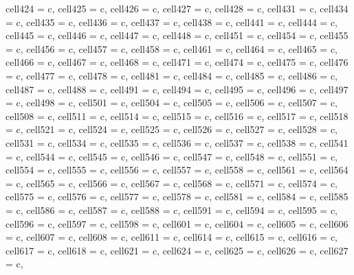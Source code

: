 \begin{longtblr}[
  label = none,
  entry = none,
]
{  cell{42}{4} = {c},
  cell{42}{5} = {c},
  cell{42}{6} = {c},
  cell{42}{7} = {c},
  cell{42}{8} = {c},
  cell{43}{1} = {c},
  cell{43}{4} = {c},
  cell{43}{5} = {c},
  cell{43}{6} = {c},
  cell{43}{7} = {c},
  cell{43}{8} = {c},
  cell{44}{1} = {c},
  cell{44}{4} = {c},
  cell{44}{5} = {c},
  cell{44}{6} = {c},
  cell{44}{7} = {c},
  cell{44}{8} = {c},
  cell{45}{1} = {c},
  cell{45}{4} = {c},
  cell{45}{5} = {c},
  cell{45}{6} = {c},
  cell{45}{7} = {c},
  cell{45}{8} = {c},
  cell{46}{1} = {c},
  cell{46}{4} = {c},
  cell{46}{5} = {c},
  cell{46}{6} = {c},
  cell{46}{7} = {c},
  cell{46}{8} = {c},
  cell{47}{1} = {c},
  cell{47}{4} = {c},
  cell{47}{5} = {c},
  cell{47}{6} = {c},
  cell{47}{7} = {c},
  cell{47}{8} = {c},
  cell{48}{1} = {c},
  cell{48}{4} = {c},
  cell{48}{5} = {c},
  cell{48}{6} = {c},
  cell{48}{7} = {c},
  cell{48}{8} = {c},
  cell{49}{1} = {c},
  cell{49}{4} = {c},
  cell{49}{5} = {c},
  cell{49}{6} = {c},
  cell{49}{7} = {c},
  cell{49}{8} = {c},
  cell{50}{1} = {c},
  cell{50}{4} = {c},
  cell{50}{5} = {c},
  cell{50}{6} = {c},
  cell{50}{7} = {c},
  cell{50}{8} = {c},
  cell{51}{1} = {c},
  cell{51}{4} = {c},
  cell{51}{5} = {c},
  cell{51}{6} = {c},
  cell{51}{7} = {c},
  cell{51}{8} = {c},
  cell{52}{1} = {c},
  cell{52}{4} = {c},
  cell{52}{5} = {c},
  cell{52}{6} = {c},
  cell{52}{7} = {c},
  cell{52}{8} = {c},
  cell{53}{1} = {c},
  cell{53}{4} = {c},
  cell{53}{5} = {c},
  cell{53}{6} = {c},
  cell{53}{7} = {c},
  cell{53}{8} = {c},
  cell{54}{1} = {c},
  cell{54}{4} = {c},
  cell{54}{5} = {c},
  cell{54}{6} = {c},
  cell{54}{7} = {c},
  cell{54}{8} = {c},
  cell{55}{1} = {c},
  cell{55}{4} = {c},
  cell{55}{5} = {c},
  cell{55}{6} = {c},
  cell{55}{7} = {c},
  cell{55}{8} = {c},
  cell{56}{1} = {c},
  cell{56}{4} = {c},
  cell{56}{5} = {c},
  cell{56}{6} = {c},
  cell{56}{7} = {c},
  cell{56}{8} = {c},
  cell{57}{1} = {c},
  cell{57}{4} = {c},
  cell{57}{5} = {c},
  cell{57}{6} = {c},
  cell{57}{7} = {c},
  cell{57}{8} = {c},
  cell{58}{1} = {c},
  cell{58}{4} = {c},
  cell{58}{5} = {c},
  cell{58}{6} = {c},
  cell{58}{7} = {c},
  cell{58}{8} = {c},
  cell{59}{1} = {c},
  cell{59}{4} = {c},
  cell{59}{5} = {c},
  cell{59}{6} = {c},
  cell{59}{7} = {c},
  cell{59}{8} = {c},
  cell{60}{1} = {c},
  cell{60}{4} = {c},
  cell{60}{5} = {c},
  cell{60}{6} = {c},
  cell{60}{7} = {c},
  cell{60}{8} = {c},
  cell{61}{1} = {c},
  cell{61}{4} = {c},
  cell{61}{5} = {c},
  cell{61}{6} = {c},
  cell{61}{7} = {c},
  cell{61}{8} = {c},
  cell{62}{1} = {c},
  cell{62}{4} = {c},
  cell{62}{5} = {c},
  cell{62}{6} = {c},
  cell{62}{7} = {c},
}
\end{longtblr}
